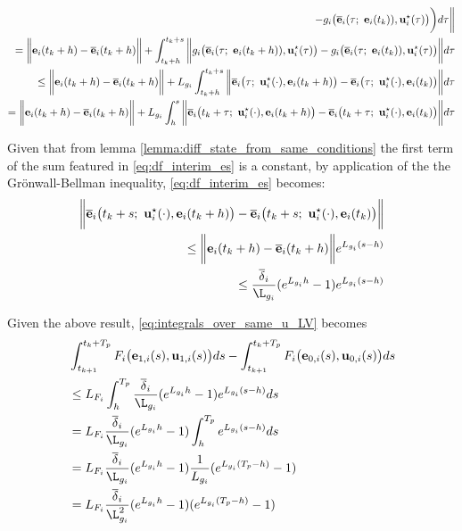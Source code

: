 \begin{gg_box}
\begin{align}
    -  g_i\big(\overline{\bm{\mathbf{e}}}_i(\tau;\ \bm{\mathbf{e}}_i(t_k)), \bm{\mathbf{u}}_i^{\star}(\tau)\big) \bigg) d\tau \bigg\| \\
    = \bigg\| \bm{\mathbf{e}}_i(t_k +h) - \overline{\bm{\mathbf{e}}}_i(t_k + h) \bigg \|
    + \int_{t_k +h}^{t_k + s} \bigg\| g_i\big(\overline{\bm{\mathbf{e}}}_i(\tau;\ \bm{\mathbf{e}}_i(t_k + h)), \bm{\mathbf{u}}_i^{\star}(\tau)\big)
    -  g_i\big(\overline{\bm{\mathbf{e}}}_i(\tau;\ \bm{\mathbf{e}}_i(t_k)), \bm{\mathbf{u}}_i^{\star}(\tau)\big) \bigg\| d\tau \\
    \leq \bigg\| \bm{\mathbf{e}}_i(t_k +h) - \overline{\bm{\mathbf{e}}}_i(t_k + h) \bigg \|
    + L_{g_i} \int_{t_k +h}^{t_k + s} \bigg\| \overline{\bm{\mathbf{e}}}_i\big(\tau;\ \bm{\mathbf{u}}_i^{\star}(\cdot), \bm{\mathbf{e}}_i(t_k + h) \big)
    -  \overline{\bm{\mathbf{e}}}_i\big(\tau;\ \bm{\mathbf{u}}_i^{\star}(\cdot), \bm{\mathbf{e}}_i(t_k)\big) \bigg\| d\tau \\
    = \bigg\| \bm{\mathbf{e}}_i(t_k +h) - \overline{\bm{\mathbf{e}}}_i(t_k + h) \bigg \|
    + L_{g_i} \int_{h}^{s} \bigg\| \overline{\bm{\mathbf{e}}}_i\big(t_k + \tau;\ \bm{\mathbf{u}}_i^{\star}(\cdot), \bm{\mathbf{e}}_i(t_k + h) \big)
    -  \overline{\bm{\mathbf{e}}}_i\big(t_k + \tau;\ \bm{\mathbf{u}}_i^{\star}(\cdot), \bm{\mathbf{e}}_i(t_k)\big) \bigg\| d\tau \\
    \label{eq:df_interim_es}
\end{align}

Given that from lemma \eqref{lemma:diff_state_from_same_conditions}
the first term of the sum featured in \eqref{eq:df_interim_es} is a constant,
by application of the the Gr\"{o}nwall-Bellman inequality,
\eqref{eq:df_interim_es} becomes:
\begin{align}
  \bigg \| \overline{\vect{e}}_i\big(t_k + s;\ \vect{u}_i^{\star}(\cdot), \vect{e}_i(t_k +h)\big)
    -\overline{\vect{e}}_i\big(t_k + s;\ \vect{u}_i^{\star}(\cdot), \vect{e}_i(t_k)\big) \bigg \| \\
    \leq \bigg\| \vect{e}_i(t_k +h) - \overline{\vect{e}}_i(t_k + h) \bigg \| e^{L_{g_i}(s-h)} \\
    \leq \dfrac{\overline{\delta}_i}{\L_{g_i}} (e^{L_{g_i}h} - 1) e^{L_{g_i}(s-h)}
\end{align}
\end{gg_box}

Given the above result, \eqref{eq:integrals_over_same_u_LV} becomes
\begin{align}
  &\int_{t_{k+1}}^{t_k + T_p} F_i \big(\vect{e}_{1,i}(s), \vect{u}_{1,i} (s)\big) d s
    - \int_{t_{k+1}}^{t_k + T_p} F_i \big(\vect{e}_{0,i}(s), \vect{u}_{0,i} (s)\big) d s \\
  & \leq L_{F_i}\int_{h}^{T_p} \dfrac{\overline{\delta}_i}{\L_{g_i}} (e^{L_{g_i}h} - 1) e^{L_{g_i}(s-h)} d s \\
  &=  L_{F_i} \dfrac{\overline{\delta}_i}{\L_{g_i}} (e^{L_{g_i}h} - 1) \int_{h}^{T_p} e^{L_{g_i}(s-h)} d s \\
  & = L_{F_i} \dfrac{\overline{\delta}_i}{\L_{g_i}} (e^{L_{g_i} h} - 1) \dfrac{1}{L_{g_i}}(e^{L_{g_i}(T_p-h)} - 1) \\
  & = L_{F_i} \dfrac{\overline{\delta}_i}{\L_{g_i}^2} (e^{L_{g_i} h} - 1) (e^{L_{g_i}(T_p-h)} - 1)
\end{align}


